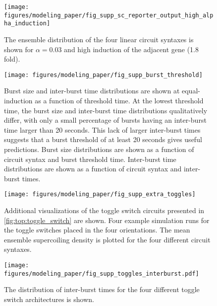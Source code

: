 \documentclass[11pt]{article}
\begin{document}
\begin{figure}[hbtp]
    \centering
    \texttt{[image: figures/modeling\_paper/fig\_supp\_sc\_reporter\_output\_high\_alpha\_induction]}
    \caption{The ensemble distribution of the four linear circuit syntaxes is shown for \(\alpha = 0.03\) and high induction of the adjacent gene (1.8 fold).}
    \label{fig:supp:sc_distributions_high_alpha_induction}
\end{figure}
\begin{figure}[hbtp]
    \centering
    {\texttt{[image: figures/modeling\_paper/fig\_supp\_burst\_threshold]}
    \label{fig:burst_threshold_burst_size}
    \label{fig:burst_threshold_interburst_time}
    }
    \caption{Burst size and inter-burst time distributions are shown at equal-induction as a function of threshold time. At the lowest threshold time, the burst size and inter-burst time distributions qualitatively differ, with only a small percentage of bursts having an inter-burst time larger than 20 seconds. This lack of larger inter-burst times suggests that a burst threshold of at least 20 seconds gives useful predictions.
         Burst size distributions are shown as a function of circuit syntax and burst threshold time.
         Inter-burst time distributions are shown as a function of circuit syntax and inter-burst times.
    }
    \label{fig:top:burst_threshold}
\end{figure}

\begin{figure}[hbtp]
    \centering
    {\texttt{[image: figures/modeling\_paper/fig\_supp\_extra\_toggles]}
    \label{fig:supp_toggles_run_examples}
    \label{fig:supp_toggles_mean_sc_density}
    }
    \caption{ Additional visualizations of the toggle switch circuits presented in \cref{fig:top:toggle_switch} are shown.
         Four example simulation runs for the toggle switches placed in the four orientations. 
         The mean ensemble supercoiling density is plotted for the four different circuit syntaxes.
    }
    \label{fig:supp:toggles_examples_density_interburst}
\end{figure}

\begin{figure}[hbtp]
    \centering
    {\texttt{[image: figures/modeling\_paper/fig\_supp\_toggles\_interburst.pdf]}
    }
    \caption{ The distribution of inter-burst times for the four different toggle switch architectures is shown.
    }
    \label{fig:supp_toggles_interburst_time}
\end{figure}
\end{document}
